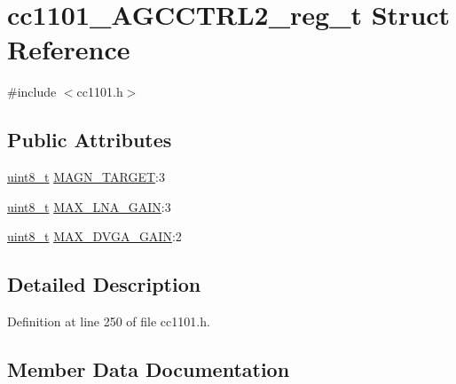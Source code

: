 \hypertarget{structcc1101___a_g_c_c_t_r_l2__reg__t}{}\section{cc1101\+\_\+\+A\+G\+C\+C\+T\+R\+L2\+\_\+reg\+\_\+t Struct Reference}
\label{structcc1101___a_g_c_c_t_r_l2__reg__t}


{\ttfamily \#include $<$cc1101.\+h$>$}

\subsection*{Public Attributes}
\begin{DoxyCompactItemize}
\item 
\hyperlink{_p_e___types_8h_aba7bc1797add20fe3efdf37ced1182c5}{uint8\+\_\+t} \hyperlink{structcc1101___a_g_c_c_t_r_l2__reg__t_a9c71a265117aaac703e06b308cf158b4}{M\+A\+G\+N\+\_\+\+T\+A\+R\+G\+ET}\+:3
\item 
\hyperlink{_p_e___types_8h_aba7bc1797add20fe3efdf37ced1182c5}{uint8\+\_\+t} \hyperlink{structcc1101___a_g_c_c_t_r_l2__reg__t_a07cb4220a1ecbb87cf305ad33a60f116}{M\+A\+X\+\_\+\+L\+N\+A\+\_\+\+G\+A\+IN}\+:3
\item 
\hyperlink{_p_e___types_8h_aba7bc1797add20fe3efdf37ced1182c5}{uint8\+\_\+t} \hyperlink{structcc1101___a_g_c_c_t_r_l2__reg__t_ac19392f07c9e32828f204837e3477ad9}{M\+A\+X\+\_\+\+D\+V\+G\+A\+\_\+\+G\+A\+IN}\+:2
\end{DoxyCompactItemize}


\subsection{Detailed Description}


Definition at line 250 of file cc1101.\+h.



\subsection{Member Data Documentation}
